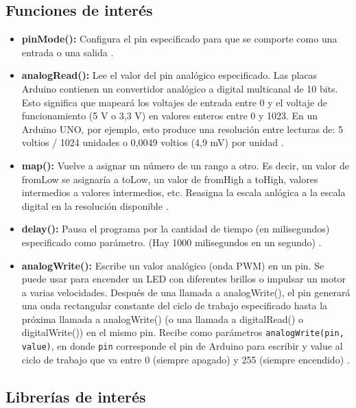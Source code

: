 \subsection{Funciones de interés}
\begin{itemize}
    \item \textbf{pinMode():} Configura el pin especificado para que se comporte como una entrada o una salida \cite{arduino}.
    \item \textbf{analogRead():} Lee el valor del pin analógico especificado. Las placas Arduino contienen un convertidor analógico a digital multicanal de 10 bits. Esto significa que mapeará los voltajes de entrada entre 0 y el voltaje de funcionamiento (5 V o 3,3 V) en valores enteros entre 0 y 1023. En un Arduino UNO, por ejemplo, esto produce una resolución entre lecturas de: 5 voltios / 1024 unidades o 0,0049 voltios (4,9 mV) por unidad \cite{arduino}.
    \item \textbf{map():} Vuelve a asignar un número de un rango a otro. Es decir, un valor de fromLow se asignaría a toLow, un valor de fromHigh a toHigh, valores intermedios a valores intermedios, etc. Reasigna la escala anlógica a la escala digital en la resolución disponible \cite{arduino}.
    \item \textbf{delay():}  Pausa el programa por la cantidad de tiempo (en milisegundos) especificado como parámetro. (Hay 1000 milisegundos en un segundo) \cite{arduino}.
    \item \textbf{analogWrite():} Escribe un valor analógico (onda PWM) en un pin. Se puede usar para encender un LED con diferentes brillos o impulsar un motor a varias velocidades. Después de una llamada a analogWrite(), el pin generará una onda rectangular constante del ciclo de trabajo especificado hasta la próxima llamada a analogWrite() (o una llamada a digitalRead() o digitalWrite()) en el mismo pin. Recibe como parámetros \texttt{analogWrite(pin, value)}, en donde \texttt{pin} corresponde el pin de Arduino para escribir y value al ciclo de trabajo que va entre 0 (siempre apagado) y 255 (siempre encendido) \cite{arduino}.
\end{itemize}

\subsection{Librerías de interés}

